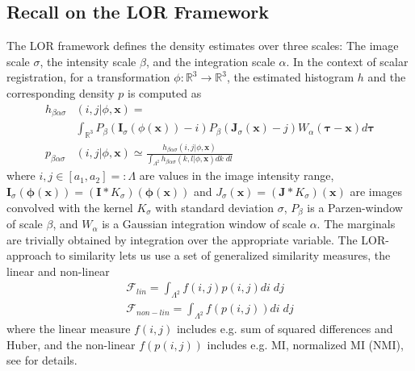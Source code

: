 \documentclass[twocolumn]{svjour3}
\begin{document}
\subsection{Recall on the LOR Framework}
The LOR framework defines the density estimates over three scales: The image scale
$\sigma$, the intensity scale $\beta$, and the integration scale $\alpha$. In the context
of scalar registration, for a transformation $\phi:\mathbb{R}^3\rightarrow\mathbb{R}^3$,
the estimated histogram $h$ and the corresponding density $p$ is computed as
\begin{align}
\label{eq:loih}
  h_{\beta\alpha\sigma}&(i,j|\phi,\bm x)=\\
                 &\int_{\mathbb R^3}P_\beta( \bm I_{\sigma}(\phi(\bm x))-i)
                   P_\beta( \bm J_{\sigma}(\bm x)-j)W_\alpha(\bm \tau-\bm x)d\bm \tau\nonumber \\
  \label{eq:loipdf}
  p_{\beta\alpha\sigma}&(i,j|\phi,\bm x)\simeq \frac{h_{\beta\alpha\sigma}(i,j|\phi,\bm x)}
                         {\int_{\Lambda^2} h_{\beta\alpha\sigma}(k,l|\phi,\bm x)dk\; dl}
\end{align} 
where $i,j\in[a_1, a_2] =: \Lambda$ are values in the image intensity range,
$\bm I_{\sigma}(\bm \phi(\bm x))=(\bm I*K_\sigma)(\bm \phi(\bm x))$ and
$ J_{\sigma}(\bm x)=(\bm J*K_\sigma)(\bm x)$ are images convolved with the kernel
$K_\sigma$ with standard deviation $\sigma$, $P_\beta$ is a Parzen-window of scale
$\beta$, and $W_\alpha$ is a Gaussian integration window of scale $\alpha$. The marginals
are trivially obtained by integration over the appropriate variable.  The LOR-approach to
similarity lets us use a set of generalized similarity measures, the linear and non-linear
\begin{align}\label{eq:sim}
  \mathcal{F}_{lin}=\int_{\Lambda^2}f(i,j)p(i,j)di\; dj\\ \mathcal{F}_{non-lin}=\int_{\Lambda^2}f(p(i,j))di\; dj
\end{align}
where the linear measure $f(i,j)$ includes e.g. sum of squared differences and Huber, and
the non-linear $f(p(i,j))$ includes e.g. MI, normalized MI (NMI), see
\cite{darknersporring2012pami} for details.
\end{document}
